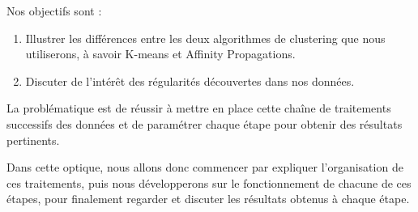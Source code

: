 Nos objectifs sont :
\begin{enumerate}
    \item Illustrer les différences entre les deux algorithmes de clustering que nous utiliserons, à savoir K-means et Affinity Propagations.
    \item Discuter de l'intérêt des régularités découvertes dans nos données.
\end{enumerate}

\vspace{0.3cm}

La problématique est de réussir à mettre en place cette chaîne de traitements successifs des données et de paramétrer chaque étape pour obtenir des résultats pertinents.

\vspace{0.3cm}

Dans cette optique, nous allons donc commencer par expliquer l'organisation de ces traitements, puis nous développerons sur le fonctionnement de chacune de ces étapes, pour finalement regarder et discuter les résultats obtenus à chaque étape.








